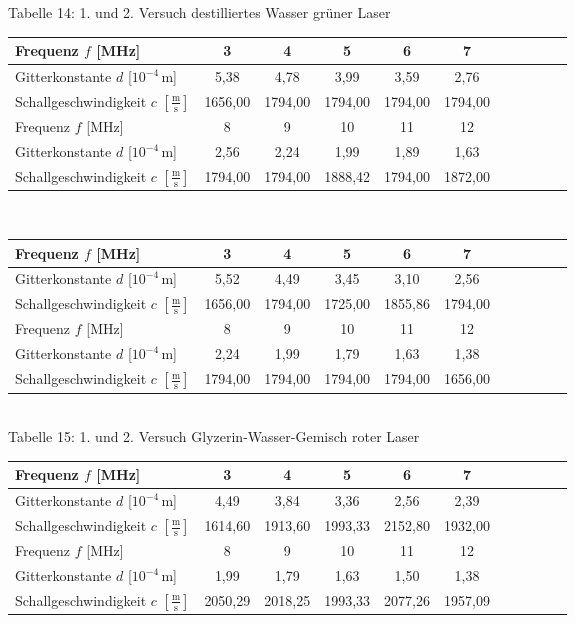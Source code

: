 \documentclass[fontsize=12pt]{scrartcl}
\begin{document}
~\\
~\\ 
Tabelle 14: 1. und 2. Versuch destilliertes Wasser grüner Laser \\
\begin{tabular}{|l|c|c|c|c|c|c|c|c|c|c|} \hline
Frequenz $f$ [MHz] & 3 & 4 & 5 & 6 & 7 \\ \hline
Gitterkonstante $d$ [$10^{-4}$\,m] & 5,38 & 4,78 & 3,99 & 3,59 & 2,76  \\ \hline
Schallgeschwindigkeit $c$ $[\frac{{\text{m}}}{{\text{s}}}]$ & 1656,00 & 1794,00 & 1794,00 & 1794,00 & 1794,00 \\ \hline
Frequenz $f$ [MHz] & 8 & 9 & 10 & 11 & 12\\ \hline
Gitterkonstante $d$ [$10^{-4}$\,m] & 2,56 & 2,24 & 1,99 &  1,89  & 1,63  \\ \hline
Schallgeschwindigkeit $c$ $[\frac{{\text{m}}}{{\text{s}}}]$ & 1794,00 &1794,00 & 1888,42 & 1794,00 & 1872,00 \\ \hline
\end{tabular} \\
\begin{tabular}{|l|c|c|c|c|c|c|c|c|c|c|} \hline
Frequenz $f$ [MHz] & 3 & 4 & 5 & 6 & 7 \\ \hline
Gitterkonstante $d$  [$10^{-4}$\,m] & 5,52 & 4,49 & 3,45 & 3,10 & 2,56  \\ \hline 
Schallgeschwindigkeit $c$ $[\frac{{\text{m}}}{{\text{s}}}]$ & 1656,00 & 1794,00 & 1725,00 & 1855,86 & 1794,00   \\ \hline
Frequenz $f$ [MHz]  & 8 & 9 & 10 & 11 & 12\\ \hline
Gitterkonstante $d$ [$10^{-4}$\,m] &  2,24 & 1,99 & 1,79 & 1,63 & 1,38 \\ \hline 
Schallgeschwindigkeit $c$ $[\frac{{\text{m}}}{{\text{s}}}]$ & 1794,00 & 1794,00 & 1794,00 & 1794,00 & 1656,00  \\ \hline
\end{tabular} \\
\newpage
\noindent
Tabelle 15: 1. und 2. Versuch Glyzerin-Wasser-Gemisch roter Laser \\
\begin{tabular}{|l|c|c|c|c|c|c|c|c|c|c|} \hline
Frequenz $f$ [MHz] & 3 & 4 & 5 & 6 & 7 \\ \hline
Gitterkonstante $d$ [$10^{-4}$\,m] & 4,49 & 3,84 & 3,36 & 2,56 & 2,39  \\ \hline
Schallgeschwindigkeit $c$ $[\frac{{\text{m}}}{{\text{s}}}]$ & 1614,60 & 1913,60 & 1993,33 & 2152,80 & 1932,00    \\ \hline
Frequenz $f$ [MHz] & 8 & 9 & 10 & 11 & 12\\ \hline
Gitterkonstante $d$ [$10^{-4}$\,m] & 1,99 & 1,79 & 1,63 & 1,50 & 1,38 \\ \hline
Schallgeschwindigkeit $c$ $[\frac{{\text{m}}}{{\text{s}}}]$ &  2050,29 & 2018,25 & 1993,33 & 2077,26 & 1957,09 \\ \hline
\end{tabular} \\
\end{document}

